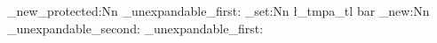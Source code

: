\cs_new_protected:Nn
  \example_unexpandable_first:
  {
    \tl_set:Nn
      \l_tmpa_tl
      { bar }
  }
\cs_new:Nn  %
  \example_unexpandable_second:
  { \example_unexpandable_first: }
